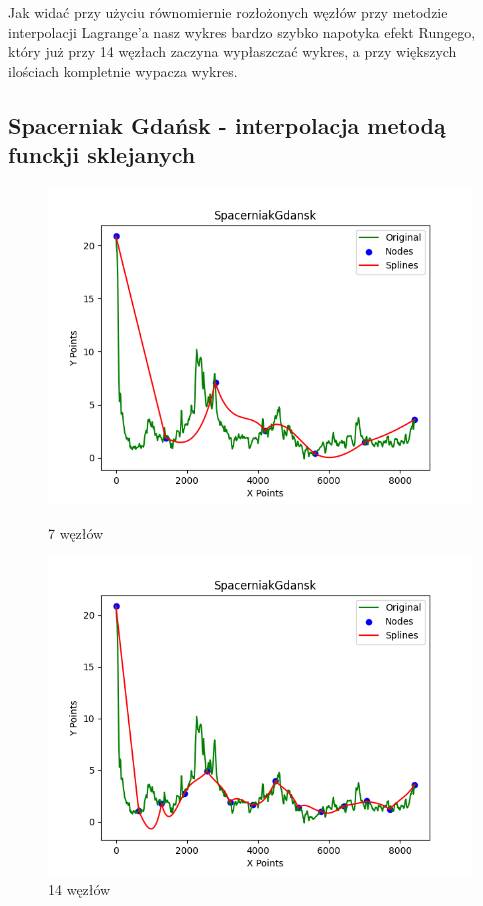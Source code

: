 \documentclass{article}
\begin{document}
Jak widać przy użyciu równomiernie rozłożonych węzłów przy metodzie interpolacji Lagrange'a nasz wykres bardzo szybko napotyka efekt Rungego, który już przy 14 węzłach zaczyna wypłaszczać wykres, a przy większych ilościach kompletnie wypacza wykres.

\subsection{Spacerniak Gdańsk - interpolacja metodą funckji sklejanych}

\begin{figure}[H]
    \centering
    \begin{minipage}[b]{0.49\textwidth}
        \centering
        \includegraphics[width=\textwidth]{plots/SpacerniakGdansk_splines_7.png}
        \caption{7 węzłów}
        \label{fig:7nodes}
    \end{minipage}
    \hfill
    \begin{minipage}[b]{0.49\textwidth}
        \centering
        \includegraphics[width=\textwidth]{plots/SpacerniakGdansk_splines_14.png}
        \caption{14 węzłów}
        \label{fig:14nodes}
    \end{minipage}
\end{figure}
\end{document}
